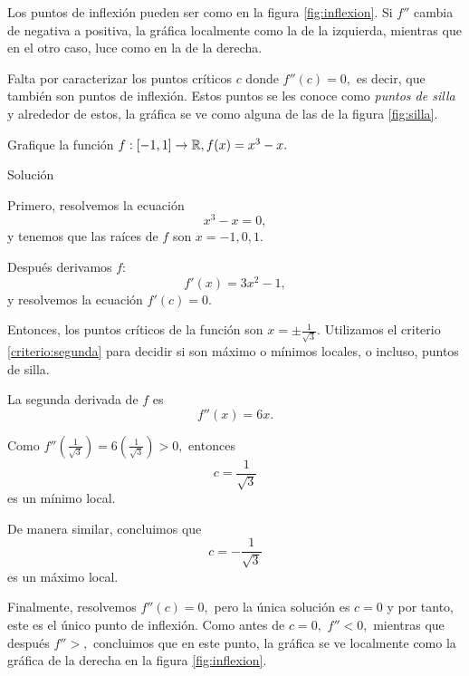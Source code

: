     Los puntos de inflexión pueden ser como en la figura \ref{fig:inflexion}. Si $f''$ cambia de negativa a positiva, la
    gráfica localmente como la de la izquierda, mientras que en el otro caso, luce como en la de la derecha.


    Falta por caracterizar los puntos críticos $c$ donde $f''(c)=0,$ es decir, que también son puntos de inflexión. Estos
    puntos se les conoce como \emph{puntos de silla} y alrededor de estos, la gráfica se ve como alguna de las de la figura
    \ref{fig:silla}.



    \begin{resuelto}
        \label{demo:grafica}
        Grafique la función $f:[-1,1]\to \mathbb{R}, f(x)=x^{3}-x.$
    \end{resuelto}


{Solución}

    Primero, resolvemos la ecuación
    $$
    x^3-x=0,
    $$
    y tenemos que las raíces de $f$ son $x=-1,0,1.$



    Después derivamos $f$:
    $$
    f'(x)=3x^{2}-1,
    $$
    y resolvemos la ecuación $f'(c)=0.$



    Entonces, los puntos críticos de la función son $x=\pm \frac{1}{\sqrt{3}}.$ Utilizamos el criterio
    \ref{criterio:segunda} para decidir si son máximo o mínimos locales, o incluso, puntos de silla.



    La segunda derivada de $f$ es
    $$
    f''(x)=6x.
    $$



    Como $f''(\frac{1}{\sqrt{3}})=6\left( \frac{1}{\sqrt{3}} \right)>0,$ entonces
    $$
    c=\dfrac{1}{\sqrt{3}}
    $$
    es un mínimo local.



    De manera similar, concluimos que
    $$
    c=-\dfrac{1}{\sqrt{3}}
    $$
    es un máximo local.



    Finalmente, resolvemos $f''(c)=0,$ pero la única solución es $c=0$ y por tanto, este es el único punto de inflexión.
    Como antes de $c=0,$ $f''<0,$ mientras que después $f''>,$ concluimos que en este punto, la gráfica se ve localmente
    como la gráfica de la derecha en la figura \ref{fig:inflexion}.



